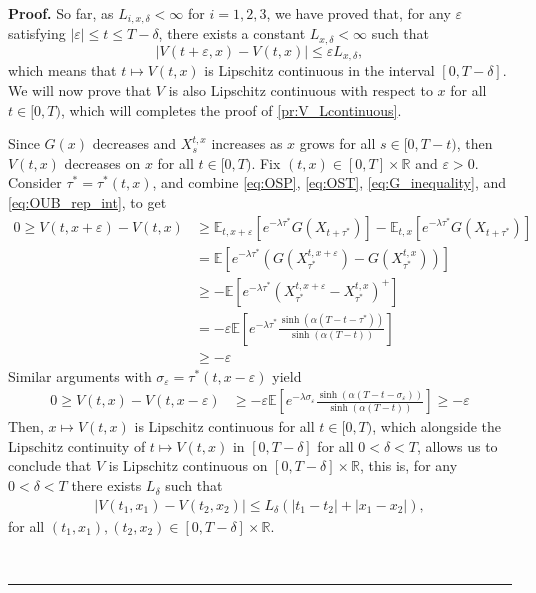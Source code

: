 \documentclass{tufte-handout}
\newcommand{\E}{\mathbb{E}} %
\newcommand{\R}{\mathbb{R}} %
\newenvironment{pf}[1][Proof]{\textbf{#1.} }{\ \rule{0.5em}{0.5em}}
\begin{document}
\begin{pf}
		So far, as  $L_{i, x, \delta} < \infty$ for $i =1, 2, 3$, we have proved that, for any $\varepsilon$ satisfying $|\varepsilon| \leq t \leq T - \delta$, there exists a constant $L_{x,\delta} < \infty$ such that
		$$
		|V(t + \varepsilon, x) - V(t, x)| \leq \varepsilon L_{x, \delta},
		$$
		which means that $t\mapsto V(t, x)$ is Lipschitz continuous in the interval $[0, T - \delta]$. We will now prove that $V$ is also Lipschitz continuous with respect to $x$ for all $t\in [0, T)$, which will completes the proof of \ref{pr:V_Lcontinuous}.
		
		Since $G(x)$ decreases and $X_s^{t, x}$ increases as $x$ grows for all $s\in[0, T - t)$, then $V(t, x)$ decreases on $x$ for all $t\in[0, T)$. Fix $(t, x)\in[0, T]\times\R$ and $\varepsilon > 0$. Consider $\tau^* = \tau^*(t, x)$, and combine \eqref{eq:OSP}, \eqref{eq:OST}, \eqref{eq:G_inequality}, and \eqref{eq:OUB_rep_int}, to get 
		\begin{align}
		0 \geq V(t, x + \varepsilon) - V(t, x) &\geq \E_{t, x + \varepsilon}\left[e^{-\lambda\tau^*}G(X_{t + \tau^*})\right] - \E_{t, x}\left[e^{-\lambda\tau^*}G(X_{t + \tau^*})\right] \nonumber \\
		&= \E\left[e^{-\lambda\tau^*}\left(G(X_{\tau^*}^{t, x + \varepsilon}) - G(X_{\tau^*}^{t, x})\right)\right] \nonumber\\
		&\geq -\E\left[e^{-\lambda\tau^*}\left(X_{\tau^*}^{t, x + \varepsilon} - X_{\tau^*}^{t, x}\right)^+\right] \nonumber\\
		&= -\varepsilon\E\left[e^{-\lambda\tau^*}\frac{\sinh(\alpha (T - t - \tau^*))}{\sinh(\alpha (T - t))}\right] \label{eq:Vx+eps-Vx}  \\
		&\geq -\varepsilon \nonumber
		\end{align}
		Similar arguments with $\sigma_\varepsilon = \tau^*(t, x - \varepsilon)$ yield
		\begin{align*}
		0 \geq V(t, x) - V(t, x - \varepsilon) &\geq -\varepsilon\E\left[e^{-\lambda\sigma_\varepsilon}\frac{\sinh(\alpha (T - t - \sigma_\varepsilon))}{\sinh(\alpha (T - t))}\right] \geq -\varepsilon
		\end{align*}
		Then, $x\mapsto V(t, x)$ is Lipschitz continuous for all $t\in[0, T)$, which alongside the Lipschitz continuity of $t\mapsto V(t, x)$	in $[0, T - \delta]$ for all $0 < \delta < T$, allows us to conclude that $V$ is Lipschitz continuous on $[0, T - \delta]\times\R$, this is, for any $0 < \delta < T$ there exists $L_\delta$ such that
		\begin{align*}
		|V(t_1, x_1) - V(t_2, x_2)| \leq L_\delta(|t_1 - t_2| + |x_1 - x_2|),
		\end{align*} 
		for all $(t_1, x_1), (t_2, x_2) \in [0, T - \delta]\times\R$.\\  \vspace{0.3cm}
		

\end{pf}
\end{document}
